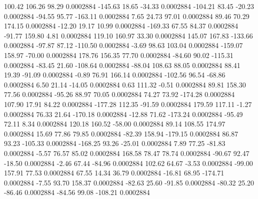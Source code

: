       100.42      106.26       98.29     0.0002884
     -145.63       18.65      -34.33     0.0002884
     -104.21       83.45      -20.23     0.0002884
      -94.55       95.77     -163.11     0.0002884
        7.65       24.73       97.01     0.0002884
       89.46       70.29      174.15     0.0002884
      -12.20       19.17       10.99     0.0002884
     -169.33       67.55       84.37     0.0002884
      -91.77      159.80        4.81     0.0002884
      119.10      160.97       33.30     0.0002884
      145.07      167.83     -133.66     0.0002884
      -97.87       87.12     -110.50     0.0002884
       -3.69       98.63      103.04     0.0002884
     -159.07      158.97      -70.00     0.0002884
      178.76      156.35       77.70     0.0002884
      -84.60       90.02     -115.31     0.0002884
      -83.45       21.60     -108.64     0.0002884
      -88.04      108.63       88.05     0.0002884
       88.41       19.39      -91.09     0.0002884
       -0.89       76.91      166.14     0.0002884
     -102.56       96.54      -68.86     0.0002884
        6.50       21.14      -14.05     0.0002884
        0.63      111.32       -0.51     0.0002884
       89.81      158.30       77.56     0.0002884
      -95.26       88.97       70.05     0.0002884
       74.27       73.92     -174.28     0.0002884
      107.90       17.91       84.22     0.0002884
     -177.28      112.35      -91.59     0.0002884
      179.59      117.11       -1.27     0.0002884
       76.33       21.64     -170.18     0.0002884
      -12.88       71.62     -173.24     0.0002884
      -95.49       72.11        8.34     0.0002884
      120.18      160.52      -58.00     0.0002884
       89.14      108.55      174.97     0.0002884
       15.69       77.86       79.85     0.0002884
      -82.39      158.94     -179.15     0.0002884
       86.87       93.23     -105.33     0.0002884
     -168.25       93.26      -25.01     0.0002884
        7.89       77.25      -81.83     0.0002884
       -5.57       76.57       85.02     0.0002884
      168.58       78.47       78.74     0.0002884
      -90.67       92.47      -18.50     0.0002884
       -2.46       67.44      -84.96     0.0002884
      102.62       64.67       -3.53     0.0002884
      -99.00      157.91       77.53     0.0002884
       67.55       14.34       36.79     0.0002884
      -16.81       68.95     -174.71     0.0002884
       -7.55       93.70      158.37     0.0002884
      -82.63       25.60      -91.85     0.0002884
      -80.32       25.20      -86.46     0.0002884
      -84.56       99.08     -108.21     0.0002884
